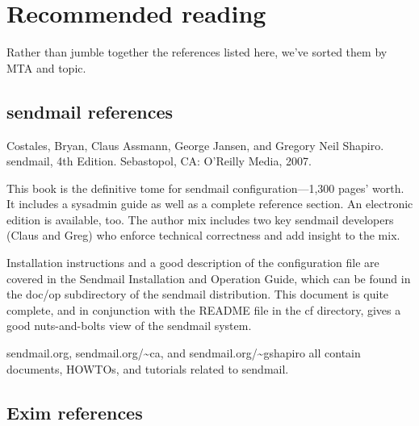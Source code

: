 \section{Recommended reading}

Rather than jumble together the references listed here, we've sorted them by MTA and topic.

\protect\hypertarget{part0026_split_066.html}{}{}

\hypertarget{part0026_split_066.htmlux5cux23_idContainer1247}{}
\hypertarget{part0026_split_066.htmlux5cux23calibre_pb_65}{%
\subsection[
references]{\texorpdfstring{{\protect\hypertarget{part0026_split_066.htmlux5cux23_idTextAnchor1203}{}{}sendmail}
references}{sendmail references}}\label{part0026_split_066.htmlux5cux23calibre_pb_65}}

{Costales, Bryan, Claus Assmann, George Jansen, and Gregory Neil
Shapiro}. {sendmail, 4th Edition.} Sebastopol, CA: O'Reilly Media, 2007.

This book is the definitive tome for {sendmail} configuration---1,300
pages' worth. It includes a sysadmin guide as well as a complete
reference section. An electronic edition is available, too. The author
mix includes two key {sendmail} developers (Claus and Greg) who enforce
technical correctness and add insight to the mix.

Installation instructions and a good description of the configuration
file are covered in the {Sendmail Installation and Operation Guide},
which can be found in the {doc/op} subdirectory of the {sendmail}
distribution. This document is quite complete, and in conjunction with
the {README} file in the {cf} directory, gives a good nuts-and-bolts
view of the {sendmail} system.

sendmail.org, sendmail.org/\textasciitilde ca, and
sendmail.org/\textasciitilde gshapiro all contain documents, HOWTOs, and
tutorials related to {sendmail}.

\protect\hypertarget{part0026_split_067.html}{}{}

\hypertarget{part0026_split_067.htmlux5cux23_idContainer1247}{}
\hypertarget{part0026_split_067.htmlux5cux23calibre_pb_66}{%
\subsection[Exim
references]{\texorpdfstring{\protect\hypertarget{part0026_split_067.htmlux5cux23_idTextAnchor1204}{}{}Exim
references}{Exim references}}\label{part0026_split_067.htmlux5cux23calibre_pb_66}}

